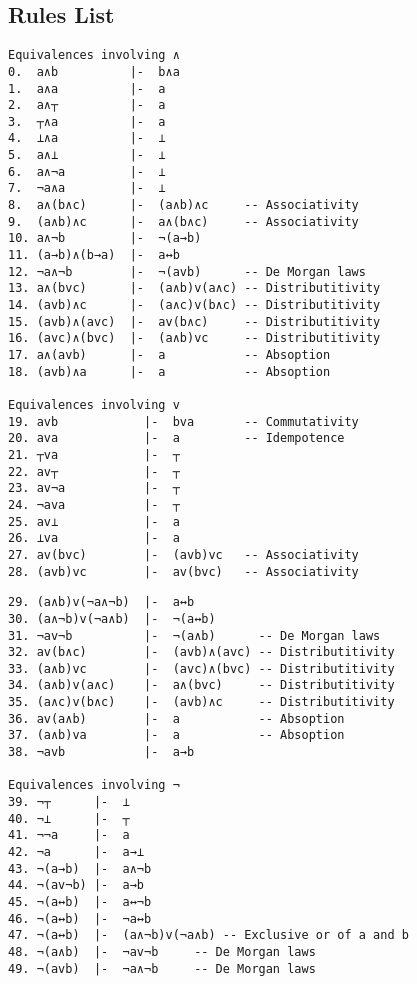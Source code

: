 \documentclass{report}
\begin{document}
\begin{appendices}
\chapter{Rules List}
\label{chap:rules_list}

\begin{listing}[ht]
\begin{verbatim}
Equivalences involving ∧
0.  a∧b          |-  b∧a
1.  a∧a          |-  a
2.  a∧┬          |-  a
3.  ┬∧a          |-  a
4.  ⊥∧a          |-  ⊥
5.  a∧⊥          |-  ⊥
6.  a∧¬a         |-  ⊥
7.  ¬a∧a         |-  ⊥       
8.  a∧(b∧c)      |-  (a∧b)∧c     -- Associativity
9.  (a∧b)∧c      |-  a∧(b∧c)     -- Associativity
10. a∧¬b         |-  ¬(a→b)
11. (a→b)∧(b→a)  |-  a↔b
12. ¬a∧¬b        |-  ¬(avb)      -- De Morgan laws
13. a∧(bvc)      |-  (a∧b)v(a∧c) -- Distributitivity
14. (avb)∧c      |-  (a∧c)v(b∧c) -- Distributitivity
15. (avb)∧(avc)  |-  av(b∧c)     -- Distributitivity
16. (avc)∧(bvc)  |-  (a∧b)vc     -- Distributitivity
17. a∧(avb)      |-  a           -- Absoption
18. (avb)∧a      |-  a           -- Absoption

Equivalences involving v
19. avb            |-  bva       -- Commutativity
20. ava            |-  a         -- Idempotence
21. ┬va            |-  ┬
22. av┬            |-  ┬
23. av¬a           |-  ┬
24. ¬ava           |-  ┬
25. av⊥            |-  a
26. ⊥va            |-  a
27. av(bvc)        |-  (avb)vc   -- Associativity
28. (avb)vc        |-  av(bvc)   -- Associativity
\end{verbatim}
\end{listing}

\begin{listing}[ht]
\begin{verbatim}
29. (a∧b)v(¬a∧¬b)  |-  a↔b
30. (a∧¬b)v(¬a∧b)  |-  ¬(a↔b)
31. ¬av¬b          |-  ¬(a∧b)      -- De Morgan laws
32. av(b∧c)        |-  (avb)∧(avc) -- Distributitivity
33. (a∧b)vc        |-  (avc)∧(bvc) -- Distributitivity
34. (a∧b)v(a∧c)    |-  a∧(bvc)     -- Distributitivity
35. (a∧c)v(b∧c)    |-  (avb)∧c     -- Distributitivity
36. av(a∧b)        |-  a           -- Absoption
37. (a∧b)va        |-  a           -- Absoption
38. ¬avb           |-  a→b

Equivalences involving ¬
39. ¬┬      |-  ⊥
40. ¬⊥      |-  ┬
41. ¬¬a     |-  a
42. ¬a      |-  a→⊥
43. ¬(a→b)  |-  a∧¬b
44. ¬(av¬b) |-  a→b
45. ¬(a↔b)  |-  a↔¬b
46. ¬(a↔b)  |-  ¬a↔b
47. ¬(a↔b)  |-  (a∧¬b)v(¬a∧b) -- Exclusive or of a and b
48. ¬(a∧b)  |-  ¬av¬b     -- De Morgan laws
49. ¬(avb)  |-  ¬a∧¬b     -- De Morgan laws


\end{verbatim}
\end{listing}
\end{appendices}
\end{document}
